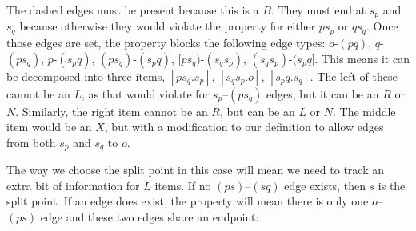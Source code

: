 \begin{center}
\end{center}

The dashed edges must be present because this is a $B$.
They must end at $s_p$ and $s_q$ because otherwise they would violate the \oneEC property for either $ps_p$ or $qs_q$.
Once those edges are set, the \oneEC property blocks the following edge types:
$o$-$(pq)$,
$q$-$(ps_q)$,
$p$-$(s_pq)$,
$(ps_q)$-$(s_pq)$,
$[ps_q)$-$(s_qs_p)$,
$(s_qs_p)$-$(s_pq]$.
This means it can be decomposed into three items, $[ps_q.s_p]$, $[s_qs_p.o]$, $[s_pq.s_q]$.
The left of these cannot be an $L$, as that would violate \oneEC for $s_p$--$(ps_q)$ edges, but it can be an $R$ or $N$.
Similarly, the right item cannot be an $R$, but can be an $L$ or $N$.
The middle item would be an $X$, but with a modification to our definition to allow edges from both $s_p$ and $s_q$ to $o$.

\begin{center}
\end{center}

The way we choose the split point in this case will mean we need to track an extra bit of information for $L$ items.
If no $(ps)$--$(sq)$ edge exists, then $s$ is the split point.
If an edge does exist, the \oneEC property will mean there is only one $o$--$(ps)$ edge and these two edges share an endpoint:

